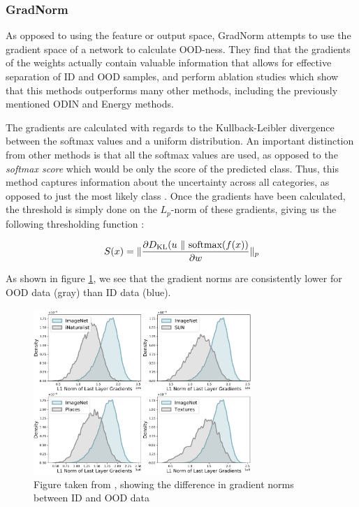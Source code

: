 \documentclass[UKenglish]{uiomasterthesis} %
\theoremstyle{definition}
\begin{document}
\subsubsection{GradNorm}

As opposed to using the feature or output space, GradNorm \cite{gradnorm} attempts to use the gradient space of a network to calculate OOD-ness. They find that the gradients of the weights actually contain valuable information that allows for effective separation of ID and OOD samples, and perform ablation studies which show that this methods outperforms many other methods, including the previously mentioned ODIN and Energy methods.

The gradients are calculated with regards to the Kullback-Leibler divergence between the softmax values and a uniform distribution. An important distinction from other methods is that all the softmax values are used, as opposed to the {\it softmax score} which would be only the score of the predicted class. Thus, this method captures information about the uncertainty across all categories, as opposed to just the most likely class \cite[3]{gradnorm}. Once the gradients have been calculated, the threshold is simply done on the $L_p$-norm of these gradients, giving us the following thresholding function \cite{gradnorm}:

\begin{equation}
\label{eq:score}
    S(\*x) = \lVert\frac{\partial D_\text{KL}(\*u~\lVert~\text{softmax}(f(\*x))}{\partial \*w}  \rVert_p
\end{equation}

As shown in figure \ref{gradnorms}, we see that the gradient norms are consistently lower for OOD data (gray) than ID data (blue).

\begin{figure}[h]
\centerline{\includegraphics[width=3.25in]{figure/gradnorm.pdf}}
\caption{Figure taken from \cite{gradnorm}, showing the difference in gradient norms between ID and OOD data}
\label{gradnorms}
\end{figure}
\end{document}
